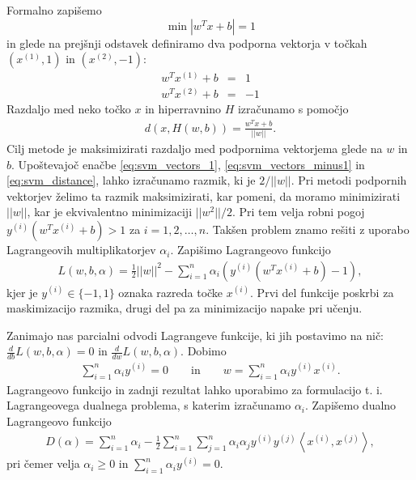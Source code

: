 \documentclass[11pt,a4paper,openany]{book}
\begin{document}
Formalno zapišemo
\begin{equation}
	\min |w^T x + b| = 1
\end{equation}
in glede na prejšnji odstavek definiramo dva podporna vektorja v točkah $(x^{(1)}, 1)$ in $(x^{(2)}, -1)$:
\begin{eqnarray}
	w^Tx^{(1)} + b &=& 1 
	\label{eq:svm_vectors_1} \\
	w^Tx^{(2)} + b &=& -1
	\label{eq:svm_vectors_minus1}
\end{eqnarray}
Razdaljo med neko točko $x$ in hiperravnino $H$ izračunamo s pomočjo
\begin{eqnarray}
	d(x, H(w, b)) = \frac{w^Tx + b}{||w||}.
	\label{eq:svm_distance}
\end{eqnarray}
Cilj metode je maksimizirati razdaljo med podpornima vektorjema glede na $w$ in $b$. Upoštevajoč enačbe \ref{eq:svm_vectors_1}, \ref{eq:svm_vectors_minus1} in \ref{eq:svm_distance}, lahko izračunamo razmik, ki je $2 / ||w||$. Pri metodi podpornih vektorjev želimo ta razmik maksimizirati, kar pomeni, da moramo minimizirati $||w||$, kar je ekvivalentno minimizaciji $||w^2||/2$. Pri tem velja robni pogoj $y^{(i)}(w^Tx^{(i)} + b) > 1$ za $i = 1, 2, \ldots, n$. Takšen problem znamo rešiti z uporabo Lagrangeovih multiplikatorjev $\alpha_i$. Zapišimo Lagrangeovo funkcijo
\begin{eqnarray}
	L(w, b, \alpha) = \frac{1}{2}||w||^2 - \sum^n_{i=1} \alpha_i(y^{(i)}(w^Tx^{(i)} + b) - 1),
\end{eqnarray}
kjer je $y^{(i)} \in \{-1, 1\}$ oznaka razreda točke $x^{(i)}$. Prvi del funkcije poskrbi za maskimizacijo razmika, drugi del pa za minimizacijo napake pri učenju.

Zanimajo nas parcialni odvodi Lagrangeve funkcije, ki jih postavimo na nič: $\frac{d}{db}L(w, b, \alpha) = 0$ in $\frac{d}{dw}L(w, b, \alpha)$. Dobimo
\begin{eqnarray}
	\sum^n_{i=1}\alpha_iy^{(i)} = 0 \qquad \text{in} \qquad
	w = \sum^n_{i=1}\alpha_iy^{(i)}x^{(i)}.
	\label{eq:svm_w}
\end{eqnarray}
Lagrangeovo funkcijo in zadnji rezultat lahko uporabimo za formulacijo t. i. Lagrangeovega dualnega problema, s katerim izračunamo $\alpha_i$. Zapišemo dualno Lagrangeovo funkcijo
\begin{eqnarray}
	D(\alpha) = \sum^n_{i=1} \alpha_i - \frac{1}{2}\sum^n_{i=1} \sum^n_{j=1} \alpha_i\alpha_j y^{(i)}y^{(j)} \left<x^{(i)},x^{(j)} \right>,
	\label{eq:svm_dual_lagrange}
\end{eqnarray}
pri čemer velja $\alpha_i \geq 0$ in $\sum^n_{i=1}\alpha_iy^{(i)} = 0$.
\end{document}
